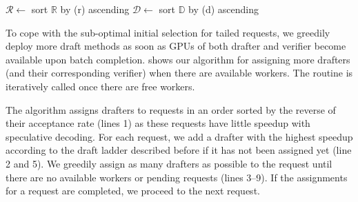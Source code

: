 \begin{algorithm}[t]
\caption{Greedy Fastest-of-N assignments. 
$b_{max}$ is the maximal verification batch size. 
}
\label{alg:bon-sched}



$\mathcal{R} \gets$ sort $\mathbb{R}$ by (r) ascending\;
$\mathcal{D} \gets$ sort $\mathbb{D}$ by (d) ascending\;

\end{algorithm}

To cope with the sub-optimal initial selection for tailed requests,
we greedily deploy more draft methods as soon as
GPUs of both drafter and verifier become available upon batch completion.
 shows our algorithm for assigning
more drafters (and their corresponding verifier) when there are available workers.
The routine is iteratively called once there are free workers.


The algorithm assigns drafters to requests in an order sorted
by the reverse of their acceptance rate (lines 1)
as these requests have little speedup with speculative decoding.
For each request, we add a drafter with the highest
speedup according to the draft ladder described before 
if it has not been assigned yet (line 2 and 5).
We greedily assign as many drafters as possible to the request
until there are no available workers or pending requests (lines 3--9).
If the assignments for a request are completed,
we proceed to the next request.


